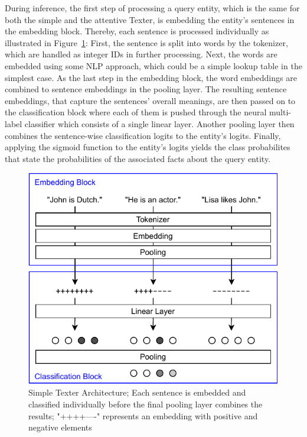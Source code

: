 During inference, the first step of processing a query entity, which is the same for both the simple and the attentive Texter, is embedding the entity's sentences in the embedding block. Thereby, each sentence is processed individually as illustrated in Figure~\ref{fig:4_approach/1_texter/1_simple_model/simple_architecture}: First, the sentence is split into words by the tokenizer, which are handled as integer IDs in further processing. Next, the words are embedded using some NLP approach, which could be a simple lookup table in the simplest case. As the last step in the embedding block, the word embeddings are combined to sentence embeddings in the pooling layer. The resulting sentence embeddings, that capture the sentences' overall meanings, are then passed on to the classification block where each of them is pushed through the neural multi-label classifier which consists of a single linear layer. Another pooling layer then combines the sentence-wise classification logits to the entity's logits. Finally, applying the sigmoid function to the entity's logits yields the class probabilites that state the probabilities of the associated facts about the query entity.

\begin{figure}[t]
    \centering
    \includegraphics{4_approach/1_texter/1_simple_model/simple_architecture}
    \caption{Simple Texter Architecture; Each sentence is embedded and classified individually before the final pooling layer combines the results; "++++----" represents an embedding with positive and negative elements}
    \label{fig:4_approach/1_texter/1_simple_model/simple_architecture}
\end{figure}

